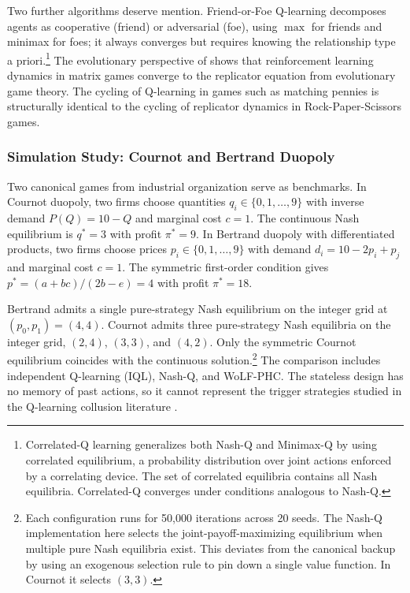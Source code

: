 Two further algorithms deserve mention. Friend-or-Foe Q-learning \citep{littman2001friend} decomposes agents as cooperative (friend) or adversarial (foe), using $\max$ for friends and minimax for foes; it always converges but requires knowing the relationship type a priori.\footnote{Correlated-Q learning \citep{greenwald2003correlated} generalizes both Nash-Q and Minimax-Q by using correlated equilibrium, a probability distribution over joint actions enforced by a correlating device. The set of correlated equilibria contains all Nash equilibria. Correlated-Q converges under conditions analogous to Nash-Q.} The evolutionary perspective of \citet{borgers1997learning} shows that reinforcement learning dynamics in matrix games converge to the replicator equation from evolutionary game theory. The cycling of Q-learning in games such as matching pennies is structurally identical to the cycling of replicator dynamics in Rock-Paper-Scissors games.

\subsubsection{Simulation Study: Cournot and Bertrand Duopoly}
\label{sec:cournot_bertrand}

Two canonical games from industrial organization serve as benchmarks.
In Cournot duopoly, two firms choose quantities
$q_i \in \{0, 1, \ldots, 9\}$ with inverse demand $P(Q) = 10 - Q$ and
marginal cost $c = 1$. The continuous Nash equilibrium is $q^* = 3$
with profit $\pi^* = 9$. In Bertrand duopoly with differentiated
products, two firms choose prices $p_i \in \{0, 1, \ldots, 9\}$ with
demand $d_i = 10 - 2 p_i + p_j$ and marginal cost $c = 1$. The
symmetric first-order condition gives
$p^* = (a + b c)/(2 b - e) = 4$ with profit $\pi^* = 18$.

Bertrand admits a single pure-strategy Nash equilibrium on the integer
grid at $(p_0, p_1) = (4, 4)$. Cournot admits three pure-strategy Nash
equilibria on the integer grid, $(2, 4)$, $(3, 3)$, and $(4, 2)$.
Only the symmetric Cournot equilibrium coincides with the continuous
solution.\footnote{Each configuration runs for 50{,}000 iterations
across 20 seeds. The Nash-Q implementation here selects the
joint-payoff-maximizing equilibrium when multiple pure Nash equilibria
exist. This deviates from the canonical \citet{hu2003nash} backup by
using an exogenous selection rule to pin down a single value function.
In Cournot it selects $(3, 3)$.} The comparison includes independent
Q-learning (IQL), Nash-Q, and WoLF-PHC. The stateless design has no
memory of past actions, so it cannot represent the trigger strategies
studied in the Q-learning collusion literature
\citep{Calvano2020,AskerEtAl2020}.

